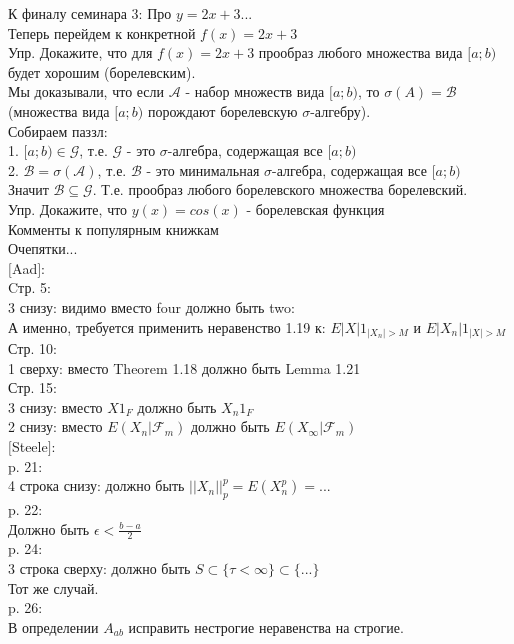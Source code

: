 
К финалу семинара 3: Про $y=2x+3$... \\

Теперь перейдем к конкретной $f(x)=2x+3$ \\
Упр. Докажите, что для $f(x)=2x+3$ прообраз любого множества вида $[a;b)$ будет хорошим (борелевским). \\
Мы доказывали, что если $\mathcal{A}$ - набор множеств вида $[a;b)$, то $\sigma (A)=\mathcal{B}$ (множества вида $[a;b)$ порождают борелевскую $\sigma$-алгебру). \\
Собираем паззл: \\
1. $[a;b)\in\mathcal{G}$, т.е. $\mathcal{G}$ - это $\sigma$-алгебра, содержащая все $[a;b)$ \\
2. $\mathcal{B}=\sigma (\mathcal{A})$, т.е. $\mathcal{B}$ - это минимальная $\sigma$-алгебра, содержащая все $[a;b)$ \\
Значит $\mathcal{B}\subseteq \mathcal{G}$. Т.е. прообраз любого борелевского множества борелевский. \\

Упр. Докажите, что $y(x)=cos(x)$ - борелевская функция \\




Комменты к популярным книжкам \\
Очепятки... \\
$[$Aad$]$: \\
Cтр. 5: \\
3 снизу: видимо вместо four должно быть two: \\
А именно, требуется применить неравенство 1.19 к:
$E|X|1_{|X_{n}|>M}$ и $E|X_{n}|1_{|X|>M}$ \\
Стр. 10: \\
1 сверху: вместо Theorem 1.18 должно быть Lemma 1.21 \\
Стр. 15: \\
3 снизу: вместо $X 1_{F}$ должно быть $X_{n} 1_{F}$ \\
2 снизу: вместо $E(X_{n}|\mathcal{F}_{m})$ должно быть
$E(X_{\infty}|\mathcal{F}_{m})$ \\

$[$Steele$]$: \\
p. 21: \\
4 строка снизу: должно быть $||X_{n}||_{p}^{p}=E(X_{n}^{p})=...$ \\
p. 22: \\
Должно быть $\epsilon<\frac{b-a}{2}$ \\
p. 24: \\
3 строка сверху: должно быть $S\subset
\{\tau<\infty\}\subset\{...\}$ \\
Тот  же случай. \\
p. 26: \\
В определении $A_{ab}$ исправить нестрогие неравенства на строгие. \\


